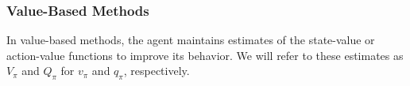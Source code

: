 \subsubsection{Value-Based Methods}
In value-based methods, the agent maintains estimates of the state-value or action-value functions to improve its behavior. We will refer to these estimates as $V_\pi$ and $Q_\pi$ for $v_\pi$ and $q_\pi$, respectively.